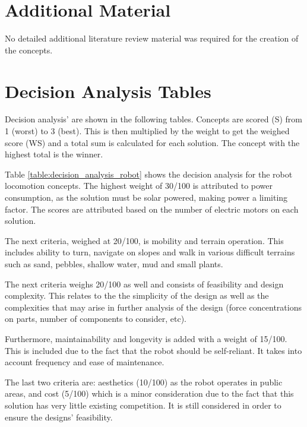 \section{Additional Material} \label{app:additional_material}

No detailed additional literature review material was required for the creation of the concepts.

\section{Decision Analysis Tables} \label{app:decision_analysis_tables}

Decision analysis' are shown in the following tables. Concepts are scored (S) from 1 (worst) to 3 (best). This is then multiplied by the weight to get the weighed score (WS) and a total sum is calculated for each solution. The concept with the highest total is the winner.

Table \ref{table:decision_analysis_robot} shows the decision analysis for the robot locomotion concepts. 
The highest weight of 30/100 is attributed to power consumption, as the solution must be solar powered, making power a limiting factor. The scores are attributed based on the number of electric motors on each solution. 

The next criteria, weighed at 20/100, is mobility and terrain operation. This includes ability to turn, navigate on slopes and walk in various difficult terrains such as sand, pebbles, shallow water, mud and small plants. 

The next criteria weighs 20/100 as well and consists of feasibility and design complexity. This relates to the the simplicity of the design as well as the complexities that may arise in further analysis of the design (force concentrations on parts, number of components to consider, etc). 

Furthermore, maintainability and longevity is added with a weight of 15/100. This is included due to the fact that the robot should be self-reliant. It takes into account frequency and ease of maintenance.

The last two criteria are: aesthetics (10/100) as the robot operates in public areas, and cost (5/100) which is a minor consideration due to the fact that this solution has very little existing competition. It is still considered in order to ensure the designs' feasibility. 


